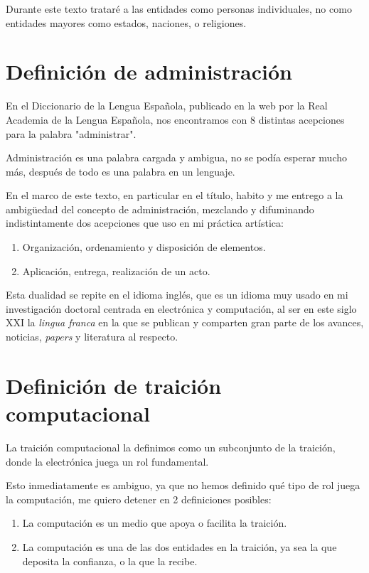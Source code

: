 \documentclass{article}
\begin{document}
Durante este texto trataré a las entidades como personas individuales, no como entidades mayores como estados, naciones, o religiones.

\clearpage

\section{Definición de administración}

En el Diccionario de la Lengua Española, publicado en la web por la Real Academia de la Lengua Española, nos encontramos con 8 distintas acepciones para la palabra "administrar"\cite{administrar}.

Administración es una palabra cargada y ambigua, no se podía esperar mucho más, después de todo es una palabra en un lenguaje.

En el marco de este texto, en particular en el título, habito y me entrego a la ambigüedad del concepto de administración, mezclando y difuminando indistintamente dos acepciones que uso en mi práctica artística:

\begin{enumerate}
    \item Organización, ordenamiento y disposición de elementos.
    \item Aplicación, entrega, realización de un acto.
\end{enumerate}

Esta dualidad se repite en el idioma inglés, que es un idioma muy usado en mi investigación doctoral centrada en electrónica y computación, al ser en este siglo XXI la \textit{lingua franca} en la que se publican y comparten gran parte de los avances, noticias, \textit{papers} y literatura al respecto.

\clearpage

\section{Definición de traición computacional}

La traición computacional la definimos como un subconjunto de la traición, donde la electrónica juega un rol fundamental.

Esto inmediatamente es ambiguo, ya que no hemos definido qué tipo de rol juega la computación, me quiero detener en  2 definiciones posibles:

\begin{enumerate}
    \item La computación es un medio que apoya o facilita la traición.
    \item La computación es una de las dos entidades en la traición, ya sea la que deposita la confianza, o la que la recibe.
\end{enumerate}
\end{document}

